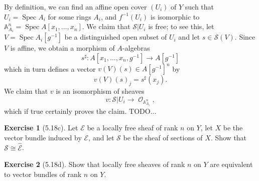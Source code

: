 \documentclass[10pt]{article}
\newcommand{\Aff}{\mathbb A}
\newcommand{\Spec}{\operatorname{Spec}}
\DeclareMathOperator{\Olo}{\mathscr O}
\theoremstyle{definition}
\newtheorem{exer}{Exercise}
\begin{document}
By definition, we can find an affine open cover $(U_i)$ of $Y$ such that $U_i = \Spec A_i$ for some rings $A_i$, and $f^{-1}(U_i)$ is isomorphic to $\Aff^n_{A_i} = \Spec A[x_1, \dots, x_n]$.
We claim that $\mathscr S|U_i$ is free; to see this, let $V = \Spec A_i[g^{-1}]$ be a distinguished open subset of $U_i$ and let $s \in \mathscr S(V)$.
Since $V$ is affine, we obtain a morphism of $A$-algebras
$$s^\sharp: A[x_1, \dots, x_n, g^{-1}] \to A[g^{-1}]$$
which in turn defines a vector $v(V)(s) \in A[g^{-1}]^n$ by
$$v(V)(s)_j = s^\sharp(x_j).$$
We claim that $v$ is an isomorphism of sheaves
$$v: \mathscr S|U_i \to \Olo_{\Aff^n_{A_i}},$$
which if true certainly proves the claim. TODO...

\begin{exer}[5.18c]
Let $\mathscr E$ be a locally free sheaf of rank $n$ on $Y$, let $X$ be the vector bundle induced by $\mathscr E$, and let $\mathscr S$ be the sheaf of sections of $X$.
Show that $\mathscr S \cong \widehat{\mathscr E}$.
\end{exer}

\begin{exer}[5.18d]
Show that locally free sheaves of rank $n$ on $Y$ are equivalent to vector bundles of rank $n$ on $Y$.
\end{exer}
\end{document}
